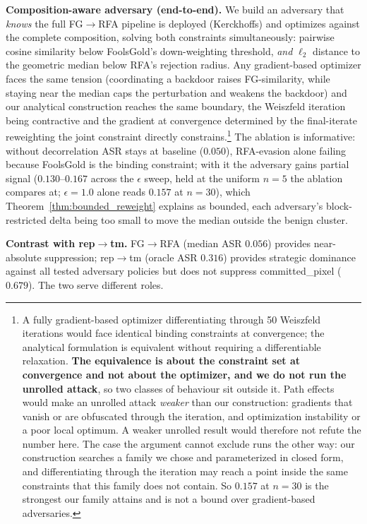 \documentclass{article}
\begin{document}
\textbf{Composition-aware adversary (end-to-end).} We build an adversary that \emph{knows} the full FG$\to$RFA pipeline is deployed (Kerckhoffs) and optimizes against the complete composition, solving both constraints simultaneously: pairwise cosine similarity below FoolsGold's down-weighting threshold, \emph{and} $\ell_2$ distance to the geometric median below RFA's rejection radius. Any gradient-based optimizer faces the same tension (coordinating a backdoor raises FG-similarity, while staying near the median caps the perturbation and weakens the backdoor) and our analytical construction reaches the same boundary, the Weiszfeld iteration being contractive and the gradient at convergence determined by the final-iterate reweighting the joint constraint directly constrains.\footnote{A fully gradient-based optimizer differentiating through 50 Weiszfeld iterations would face identical binding constraints at convergence; the analytical formulation is equivalent without requiring a differentiable relaxation. \textbf{The equivalence is about the constraint set at convergence and not about the optimizer, and we do not run the unrolled attack}, so two classes of behaviour sit outside it. Path effects would make an unrolled attack \emph{weaker} than our construction: gradients that vanish or are obfuscated through the iteration, and optimization instability or a poor local optimum. A weaker unrolled result would therefore not refute the number here. The case the argument cannot exclude runs the other way: our construction searches a family we chose and parameterized in closed form, and differentiating through the iteration may reach a point inside the same constraints that this family does not contain. So $0.157$ at $n{=}30$ is the strongest our family attains and is not a bound over gradient-based adversaries.} The ablation is informative: without decorrelation ASR stays at baseline ($0.050$), RFA-evasion alone failing because FoolsGold is the binding constraint; with it the adversary gains partial signal ($0.130$--$0.167$ across the $\epsilon$ sweep, held at the uniform $n{=}5$ the ablation compares at; $\epsilon{=}1.0$ alone reads $0.157$ at $n{=}30$), which Theorem~\ref{thm:bounded_reweight} explains as bounded, each adversary's block-restricted delta being too small to move the median outside the benign cluster.

\textbf{Contrast with rep$\to$tm.} FG$\to$RFA (median ASR $0.056$) provides near-absolute suppression; rep$\to$tm (oracle ASR $0.316$) provides strategic dominance against all tested adversary policies but does not suppress committed\_pixel ($0.679$). The two serve different roles.
\end{document}
